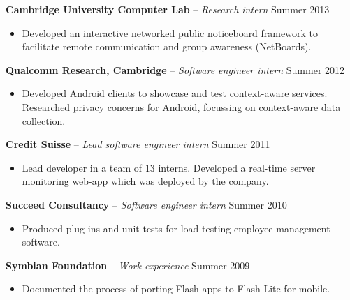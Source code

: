 \documentclass{article}
\begin{document}
\textbf{Cambridge University Computer Lab} -- \emph{Research intern} \hspace*{\fill} Summer
2013 \\[-6mm]
\begin{itemize}
  \item[]
  Developed an interactive networked public noticeboard framework to facilitate remote communication and group awareness (NetBoards).%
\end{itemize} \smallskip

\textbf{Qualcomm Research, Cambridge} -- \emph{Software engineer intern} \hspace*{\fill} Summer
2012 \\[-6mm]
\begin{itemize}
  \item[] Developed Android clients to showcase and test context-aware services.
  Researched privacy concerns for Android, focussing on context-aware data collection.
\end{itemize} \smallskip

\textbf{Credit Suisse} -- \emph{Lead software engineer intern} \hfill Summer 2011 \\[-6mm]
\begin{itemize}
  \item[] Lead developer in a team of 13 interns. Developed a real-time server monitoring web-app which was deployed by the company.
\end{itemize} \smallskip

\textbf{Succeed Consultancy} -- \emph{Software engineer intern} \hfill Summer 2010 \\[-6mm]
\begin{itemize}
  \item[] Produced plug-ins and unit tests for load-testing employee management software.
\end{itemize} \smallskip

\textbf{Symbian Foundation} -- \emph{Work experience} \hfill Summer 2009 \\[-6mm]
\begin{itemize}
  \item[] Documented the process of porting Flash apps to Flash Lite for mobile.
\end{itemize} \smallskip
\end{document}
